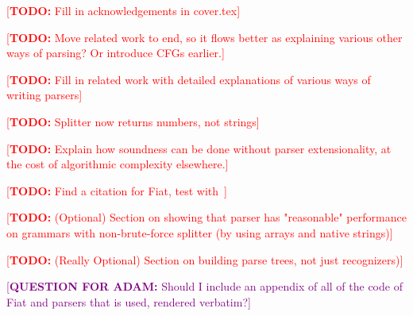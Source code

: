 \newcommand{\todo}[1]{\textcolor{red}{[\textbf{TODO:} #1]}}
\newcommand{\todoask}[1]{\textcolor{purple}{[\textbf{QUESTION FOR ADAM:} #1]}}

\todo{Fill in acknowledgements in cover.tex}

\todo{Move related work to end, so it flows better as explaining various other ways of parsing?  Or introduce CFGs earlier.}

\todo{Fill in related work with detailed explanations of various ways of writing parsers}

\todo{Splitter now returns numbers, not strings}

\todo{Explain how soundness can be done without parser extensionality, at the cost of algorithmic complexity elsewhere.}

\todo{Find a citation for Fiat, test with~\cite{fiat}}

\todo{(Optional) Section on showing that parser has "reasonable" performance on grammars with non-brute-force splitter (by using arrays and native strings)}

\todo{(Really Optional) Section on building parse trees, not just recognizers)}

\todoask{Should I include an appendix of all of the code of Fiat and parsers that is used, rendered verbatim?}

\cleardoublepage
{}
